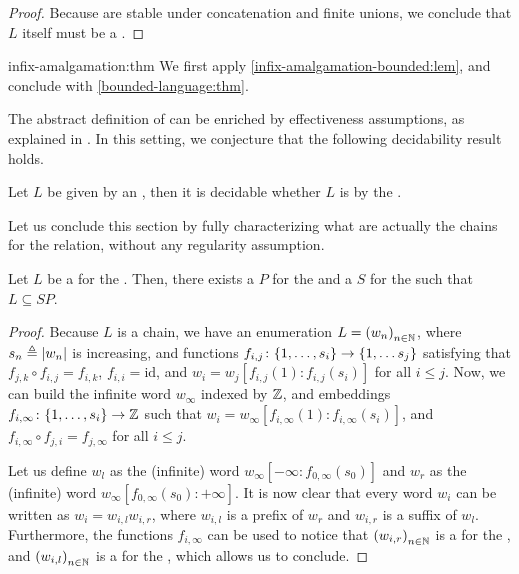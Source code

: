 \begin{proof}
    Because  are stable under concatenation and finite
    unions, we conclude that $L$ itself must be a .
\end{proof}

\begin{proofof}{infix-amalgamation:thm}
    We first apply \cref{infix-amalgamation-bounded:lem},
    and conclude with \cref{bounded-language:thm}.
\end{proofof}

The abstract definition of  can be enriched by
effectiveness assumptions, as explained in \cite[Section 3.1.4]{ASZZ24}. In
this setting, we conjecture that the following decidability result holds.

\begin{conjecture}
    Let $L$ be given by an ,
    then it is decidable whether $L$ 
    is  by the .
\end{conjecture}


Let us conclude this section by fully characterizing what are
actually the chains for the  relation, without any 
regularity assumption.

\begin{lemma}
    \label{chains-infix:lem}
    Let $L$ be a  for the . Then, there exists
    a  $P$ for the  and a 
    $S$ for the  such that $L \subseteq SP$.
\end{lemma}
\begin{proof}
    Because $L$ is a chain,
    we have an enumeration $L = \seqof{w_n}$,
    where $s_n \triangleq \left| w_n \right|$ is increasing, 
    and functions
    $f_{i,j} \colon \{ 1, \dots, s_i \} \to \{ 1, \dots s_{j} \}$
    satisfying
    that $f_{j,k} \circ f_{i, j} = f_{i, k}$,
    $f_{i,i} = \mathrm{id}$, and
    $w_i = w_j[f_{i,j}(1):f_{i,j}(s_i)]$ for all $i \leq j$.
    Now, we can build the infinite word $w_\infty$ indexed by $\mathbb{Z}$, and
    embeddings $f_{i, \infty} \colon \{ 1, \dots, s_i \} \to \mathbb{Z}$ such that
    $w_i = w_\infty[f_{i, \infty}(1):f_{i, \infty}(s_i)]$, and $f_{i, \infty}
    \circ f_{j, i} = f_{j, \infty}$ for all $i \leq j$.

    Let us define $w_l$ as the (infinite) word $w_\infty[-\infty: f_{0,
    \infty}(s_0)]$ and $w_r$ as the (infinite) word $w_\infty[f_{0,
    \infty}(s_0): +\infty]$. It is now clear that every word $w_i$ can be
    written as $w_i = w_{i,l} w_{i,r}$, where $w_{i,l}$ is a prefix of $w_r$
    and $w_{i,r}$ is a suffix of $w_l$. Furthermore, the functions $f_{i,
    \infty}$ can be used to notice that $\seqof{w_{i,r}}$ is a  for
    the , and $\seqof{w_{i,l}}$ is a  for the
    , which allows us to conclude.
\end{proof}


